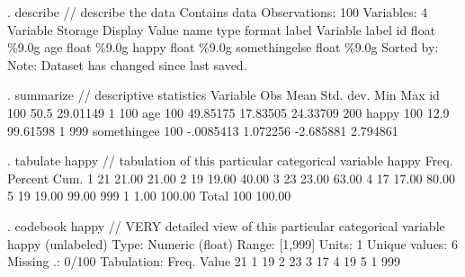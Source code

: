\documentclass[
]{article}
\begin{document}
\begin{stlog}
. describe // describe the data
{\smallskip}
Contains data
 Observations:           100                  
    Variables:             4                  
Variable      Storage   Display    Value
    name         type    format    label      Variable label
id              float   \%9.0g                 
age             float   \%9.0g                 
happy           float   \%9.0g                 
somethingelse   float   \%9.0g                 
Sorted by: 
     Note: Dataset has changed since last saved.
\end{stlog}

\begin{stlog}
. summarize // descriptive statistics
{\smallskip}
    Variable {\VBAR}        Obs        Mean    Std. dev.       Min        Max
          id {\VBAR}        100        50.5    29.01149          1        100
         age {\VBAR}        100    49.85175    17.83505   24.33709        200
       happy {\VBAR}        100        12.9    99.61598          1        999
somethinge{\tytilde}e {\VBAR}        100   -.0085413    1.072256  -2.685881   2.794861
\end{stlog}

\begin{stlog}
. tabulate happy // tabulation of this particular categorical variable
{\smallskip}
      happy {\VBAR}      Freq.     Percent        Cum.
          1 {\VBAR}         21       21.00       21.00
          2 {\VBAR}         19       19.00       40.00
          3 {\VBAR}         23       23.00       63.00
          4 {\VBAR}         17       17.00       80.00
          5 {\VBAR}         19       19.00       99.00
        999 {\VBAR}          1        1.00      100.00
      Total {\VBAR}        100      100.00
\end{stlog}

\begin{stlog}
. codebook happy // VERY detailed view of this particular categorical variable
{\smallskip}
happy                                                                     (unlabeled)
{\smallskip}
                  Type: Numeric (float)
{\smallskip}
                 Range: [1,999]                       Units: 1
         Unique values: 6                         Missing .: 0/100
{\smallskip}
            Tabulation: Freq.  Value
                           21  1
                           19  2
                           23  3
                           17  4
                           19  5
                            1  999
\end{stlog}
\end{document}
